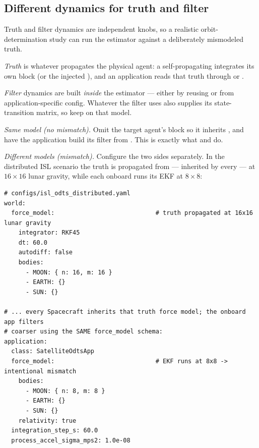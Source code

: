 \subsection{Different dynamics for truth and filter}
\label{sec:sim-truth-filter}

Truth and filter dynamics are independent knobs, so a realistic orbit-determination
study can run the estimator against a deliberately mismodeled truth.

\emph{Truth} is whatever propagates the physical agent: a self-propagating
 integrates its own  block (or the injected
), and an application reads that truth through
 or .

\emph{Filter} dynamics are built \emph{inside} the estimator  ---
either by reusing  or from application-specific config.
Whatever the filter uses also supplies its state-transition matrix, so keep
 on that model.

\emph{Same model (no mismatch).} Omit the target agent's  block so
it inherits , and have the application build its filter
from . This is exactly what
 and 
do.

\emph{Different models (mismatch).} Configure the two sides separately. In the
distributed ISL scenario the truth is propagated from 
--- inherited by every  --- at $16 \times 16$ lunar gravity, while
each onboard  runs its EKF at $8 \times 8$:

\begin{lstlisting}[language=yamlcfg, caption={Deliberate truth/filter force-model mismatch.}, label={lst:sim-yaml-mismatch}]
# configs/isl_odts_distributed.yaml
world:
  force_model:                            # truth propagated at 16x16 lunar gravity
    integrator: RKF45
    dt: 60.0
    autodiff: false
    bodies:
      - MOON: { n: 16, m: 16 }
      - EARTH: {}
      - SUN: {}

# ... every Spacecraft inherits that truth force model; the onboard app filters
# coarser using the SAME force_model schema:
application:
  class: SatelliteOdtsApp
  force_model:                            # EKF runs at 8x8 -> intentional mismatch
    bodies:
      - MOON: { n: 8, m: 8 }
      - EARTH: {}
      - SUN: {}
    relativity: true
  integration_step_s: 60.0
  process_accel_sigma_mps2: 1.0e-08
\end{lstlisting}

